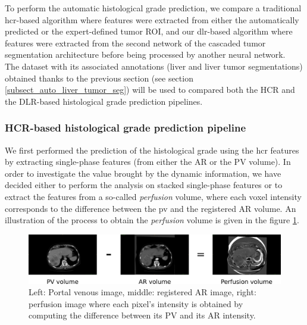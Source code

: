 To perform the automatic histological grade prediction, we compare a traditional \ac{hcr}-based algorithm where features were extracted from either the automatically predicted or the expert-defined tumor ROI, and our \ac{dlr}-based algorithm where features were extracted from the second network of the cascaded tumor segmentation architecture before being processed by another neural network.\\
The \textbf{} dataset with its associated annotations (liver and liver tumor segmentations) obtained thanks to the previous section (see section \ref{subsect_auto_liver_tumor_seg}) will be used to compared both the HCR and the DLR-based histological grade prediction pipelines.


\subsubsection{HCR-based histological grade prediction pipeline}\label{hcr-based_method}

We first performed the prediction of the histological grade using the \ac{hcr} features by extracting single-phase features (from either the AR or the PV volume).
In order to investigate the value brought by the dynamic information, we have decided either to perform the analysis on stacked single-phase features or to extract the features from a so-called \textit{perfusion} volume, where each voxel intensity corresponds to the difference between the \ac{pv} and the registered AR volume. An illustration of the process to obtain the \textit{perfusion} volume is given in the figure \ref{fig:perfusion}.

\begin{figure}
	\centering
	\includegraphics[width=0.9\linewidth]{../Contributions/images/perfusion}
	\caption{Left: Portal venous image, middle: registered AR image, right: perfusion image where each pixel's intensity is obtained by computing the difference between its PV and its AR intensity.}
	\label{fig:perfusion}
\end{figure}

